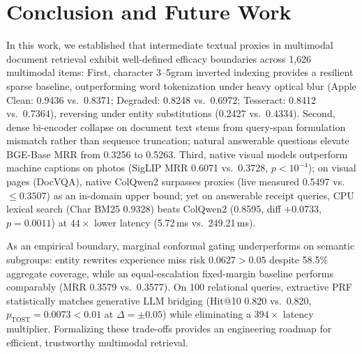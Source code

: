 \vspace{1.0mm}
\section{Conclusion and Future Work}
\label{sec:conclusion}

In this work, we established that intermediate textual proxies in multimodal document retrieval exhibit well-defined efficacy boundaries across 1,626 multimodal items: First, character 3--5gram inverted indexing provides a resilient sparse baseline, outperforming word tokenization under heavy optical blur (Apple Clean: 0.9436 vs.\ 0.8371; Degraded: 0.8248 vs.\ 0.6972; Tesseract: 0.8412 vs.\ 0.7364), reversing under entity substitutions (0.2427 vs.\ 0.4334). Second, dense bi-encoder collapse on document text stems from query-span formulation mismatch rather than sequence truncation; natural answerable questions elevate BGE-Base MRR from 0.3256 to 0.5263. Third, native visual models outperform machine captions on photos (SigLIP MRR 0.6071 vs.\ 0.3728, $p < 10^{-4}$); on visual pages (DocVQA), native ColQwen2 surpasses proxies (live measured 0.5497 vs.\ $\le 0.3507$) as an in-domain upper bound; yet on answerable receipt queries, CPU lexical search (Char BM25 0.9328) beats ColQwen2 (0.8595, diff $+0.0733$, $p=0.0011$) at $44\times$ lower latency (5.72\,ms vs.\ 249.21\,ms).

As an empirical boundary, marginal conformal gating underperforms on semantic subgroups: entity rewrites experience miss risk $0.0627 > 0.05$ despite 58.5\% aggregate coverage, while an equal-escalation fixed-margin baseline performs comparably (MRR 0.3579 vs.\ 0.3577). On 100 relational queries, extractive PRF statistically matches generative LLM bridging (Hit@10 0.820 vs.\ 0.820, $p_{\text{TOST}}=0.0073 < 0.01$ at $\Delta=\pm 0.05$) while eliminating a $394\times$ latency multiplier. Formalizing these trade-offs provides an engineering roadmap for efficient, trustworthy multimodal retrieval.

\vspace{1.0mm}
\appendices

